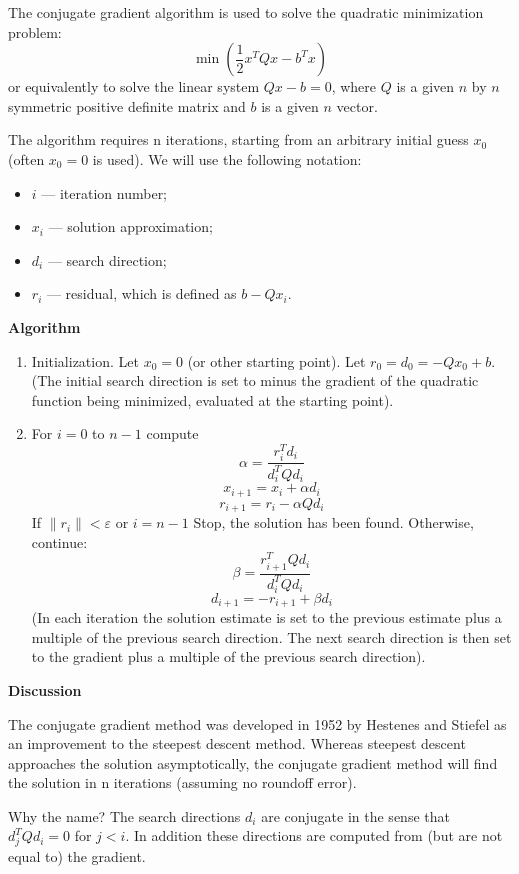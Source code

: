 \documentclass[12pt]{article}
\begin{document}
The conjugate gradient algorithm is used to solve the quadratic minimization problem:
$$
 \min\left( \frac{1}{2} x^T Q x - b^T x\right)
$$
or equivalently to solve the linear system $Q x - b = 0$, where $Q$ is a given $n$ by $n$ symmetric positive definite matrix and $b$ is a given $n$ vector.

The algorithm requires n iterations, starting from an arbitrary initial guess $x_0$ (often $x_0 = 0$ is used). We will use the following notation:
\begin{itemize}
\item $i$ --- iteration number;
\item $x_i$ --- solution approximation;
\item $d_i$ --- search direction;
\item $r_i$ --- residual, which is defined as $b-Q x_i$.
\end{itemize}

\textbf{Algorithm}

\begin{enumerate}
\item Initialization. Let $x_0=0$ (or other starting point). Let $r_0 = d_0 = -Q x_0 + b$. (The initial search direction is set to minus the gradient of the quadratic function being minimized, evaluated at the starting point).
\item For $i = 0$ to $n-1$ compute
\[
\alpha =  \frac{r_i^T d_i}{d_i^T Q d_i}
\]
\[
x_{i+1} = x_i + \alpha d_i
\]
\[
r_{i+1} = r_i - \alpha Q d_i
\]
If $\|r_i\| < \varepsilon$ or $i = n-1$ Stop, the solution has been found.  Otherwise, continue:
\[
\beta = \frac{r_{i+1}^T Q d_i}{d_i^T Q d_i}
\]
\[
d_{i+1} = -r_{i+1}+\beta d_i
\]
(In each iteration the solution estimate is set to the previous estimate plus a multiple of the previous search direction. The next search direction is then set to the gradient plus a multiple of the previous search direction).
\end{enumerate}

\textbf{Discussion}

The conjugate gradient method was developed in 1952 by Hestenes and Stiefel as an improvement to the steepest descent method.  Whereas steepest descent approaches the solution asymptotically, the conjugate gradient method will find the solution in n iterations (assuming no roundoff error).

Why the name? The search directions $d_i$ are conjugate in the sense that $d_j^T Q d_i = 0$ for $j<i$.  In addition these directions are computed from (but are not equal to) the gradient.
\end{document}
